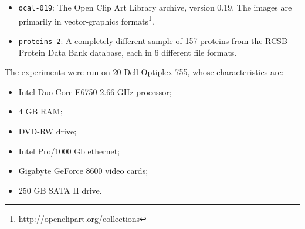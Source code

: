 {\begin{itemize}



\item {\tt ocal-019}: The Open Clip Art Library archive, version 0.19. The images are primarily in vector-graphics formats\footnote{http://openclipart.org/collections}.


\item {\tt proteins-2}: A completely different sample of 157 proteins from the RCSB Protein Data Bank database, each in 6 different file formats.


\end{itemize}



The experiments were run on $20$ Dell Optiplex 755, whose characteristics are:
\begin{itemize}

\item Intel Duo Core E6750 2.66 GHz processor;

\item 4 GB RAM;

\item DVD-RW drive;

\item Intel Pro/1000 Gb ethernet;

\item Gigabyte GeForce 8600 video cards;

\item 250 GB SATA II drive. 

\end{itemize}
}


